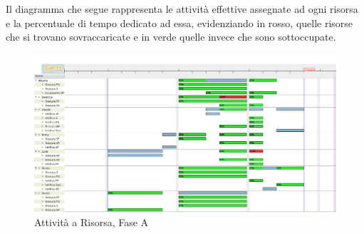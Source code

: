 Il diagramma che segue rappresenta le attività effettive assegnate ad ogni risorsa e la percentuale di tempo dedicato ad essa, evidenziando in rosso, quelle risorse che si trovano sovraccaricate e in verde quelle invece che sono sottoccupate.
\begin{landscape}
\begin{figure}[h]
	\centering
	\includegraphics[width=\linewidth]{./content/Immagini/AnalisiR.png}
	\caption{Attività a Risorsa, Fase A}
\end{figure}
\end{landscape}
\pagebreak
